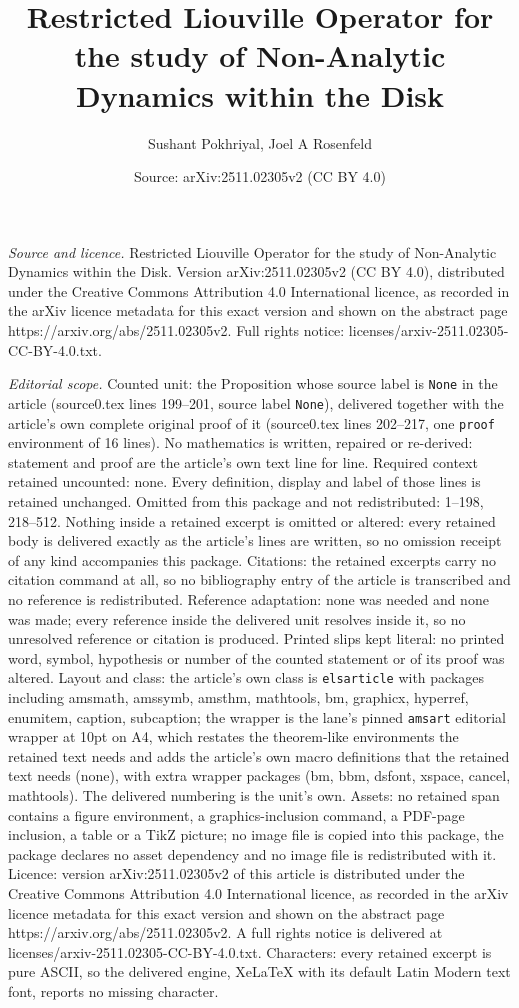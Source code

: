 \documentclass[10pt,a4paper]{amsart}
\title[Restricted Liouville Operator for the study of Non-Analytic ]{Restricted Liouville Operator for the study of Non-Analytic Dynamics within the Disk}
\author{Sushant Pokhriyal, Joel A Rosenfeld}
\date{Source: arXiv:2511.02305v2 (CC BY 4.0)}
\begin{document}
\maketitle

\noindent\emph{Source and licence.} Restricted Liouville Operator for the study of Non-Analytic Dynamics within the Disk. Version arXiv:2511.02305v2 (CC BY 4.0), distributed under the Creative Commons Attribution 4.0 International licence, as recorded in the arXiv licence metadata for this exact version and shown on the abstract page https://arxiv.org/abs/2511.02305v2. Full rights notice: licenses/arxiv-2511.02305-CC-BY-4.0.txt.\par\smallskip

\noindent\textit{Editorial scope.} Counted unit: the Proposition whose source label is \texttt{None} in the article (source0.tex lines 199--201, source label \texttt{None}), delivered together with the article's own complete original proof of it (source0.tex lines 202--217, one \texttt{proof} environment of 16 lines). No mathematics is written, repaired or re-derived: statement and proof are the article's own text line for line. Required context retained uncounted: none. Every definition, display and label of those lines is retained unchanged. Omitted from this package and not redistributed: 1--198, 218--512. Nothing inside a retained excerpt is omitted or altered: every retained body is delivered exactly as the article's lines are written, so no omission receipt of any kind accompanies this package. Citations: the retained excerpts carry no citation command at all, so no bibliography entry of the article is transcribed and no reference is redistributed. Reference adaptation: none was needed and none was made; every reference inside the delivered unit resolves inside it, so no unresolved reference or citation is produced. Printed slips kept literal: no printed word, symbol, hypothesis or number of the counted statement or of its proof was altered. Layout and class: the article's own class is \texttt{elsarticle} with packages including amsmath, amssymb, amsthm, mathtools, bm, graphicx, hyperref, enumitem, caption, subcaption; the wrapper is the lane's pinned \texttt{amsart} editorial wrapper at 10pt on A4, which restates the theorem-like environments the retained text needs and adds the article's own macro definitions that the retained text needs (none), with extra wrapper packages (bm, bbm, dsfont, xspace, cancel, mathtools). The delivered numbering is the unit's own. Assets: no retained span contains a figure environment, a graphics-inclusion command, a PDF-page inclusion, a table or a TikZ picture; no image file is copied into this package, the package declares no asset dependency and no image file is redistributed with it. Licence: version arXiv:2511.02305v2 of this article is distributed under the Creative Commons Attribution 4.0 International licence, as recorded in the arXiv licence metadata for this exact version and shown on the abstract page https://arxiv.org/abs/2511.02305v2. A full rights notice is delivered at licenses/arxiv-2511.02305-CC-BY-4.0.txt. Characters: every retained excerpt is pure ASCII, so the delivered engine, XeLaTeX with its default Latin Modern text font, reports no missing character.
\end{document}
